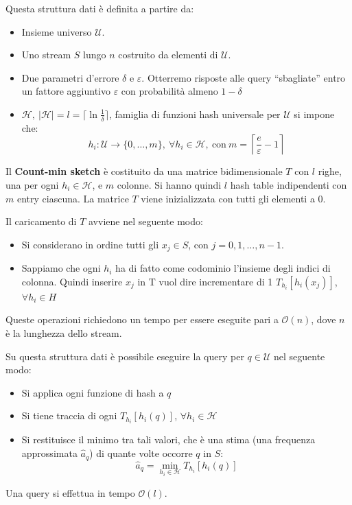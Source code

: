 Questa struttura dati è definita a partire da:
\begin{itemize}
    \item Insieme universo $\mathcal{U}$.
    \item Uno stream $S$ lungo $n$ costruito da elementi di $\mathcal{U}$.
    \item Due parametri d'errore $\delta$ e $\varepsilon$. Otterremo risposte
          alle query ``sbagliate'' entro un fattore aggiuntivo $\varepsilon$ con
          probabilità almeno $1 - \delta$
    \item $\mathcal{H}, \ |\mathcal{H}| = l = \lceil \ln \frac{1}{\delta} \rceil$,
          famiglia di funzioni hash universale per $\mathcal{U}$ si impone che:
          \begin{equation}
              h_i: \mathcal{U} \to \{0, \dots, m\}, \ \forall h_i \in \mathcal{H},
              \ \text{con} \ m = \left\lceil \frac{e}{\varepsilon} - 1 \right\rceil
          \end{equation}
\end{itemize}
Il \textbf{Count-min sketch} è costituito da una matrice bidimensionale $T$ con
$l$ righe, una per ogni $h_i \in \mathcal{H}$, e $m$ colonne. Si hanno quindi $l$
hash table indipendenti con $m$ entry ciascuna. La matrice $T$ viene inizializzata
con tutti gli elementi a $0$.

Il caricamento di $T$ avviene nel seguente modo:
\begin{itemize}
    \item Si considerano in ordine tutti gli $x_j \in S$, con $j = 0, 1, \dots,
              n - 1$.
    \item Sappiamo che ogni $h_i$ ha di fatto come codominio l'insieme degli indici
          di colonna. Quindi inserire $x_j$ in T vuol dire incrementare di 1
          $T_{h_i} [h_i(x_j)]$, $\forall h_i \in H$
\end{itemize}
Queste operazioni richiedono un tempo per essere eseguite pari a $\mathcal{O}(n)$,
dove $n$ è la lunghezza dello stream.

Su questa struttura dati è possibile eseguire la query per $q \in \mathcal{U}$
nel seguente modo:
\begin{itemize}
    \item Si applica ogni funzione di hash a $q$
    \item Si tiene traccia di ogni $T_{h_i} [h_i(q)]$, $\forall h_i \in \mathcal{H}$
    \item Si restituisce il minimo tra tali valori, che è una stima (una frequenza
          approssimata $\hat{a}_q$) di quante volte occorre $q$ in $S$:
          \begin{equation}
              \hat{a}_q = \min_{h_i \in \mathcal{H}} T_{h_i} [h_i(q)]
          \end{equation}
\end{itemize}
Una query si effettua in tempo $\mathcal{O}(l)$.

